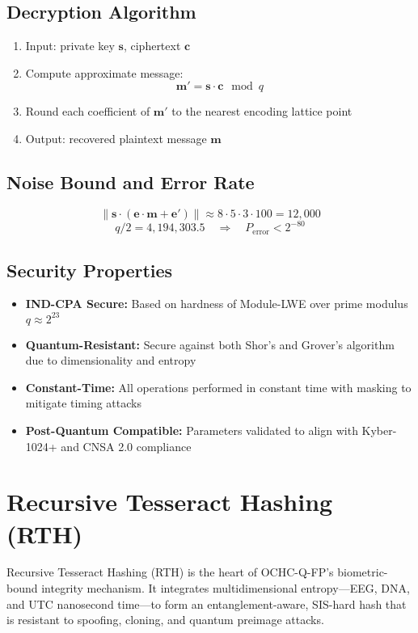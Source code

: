 \documentclass[12pt]{article}
\begin{document}
\subsection*{Decryption Algorithm}

\begin{enumerate}
    \item Input: private key \( \mathbf{s} \), ciphertext \( \mathbf{c} \)
    \item Compute approximate message:
    \[
    \mathbf{m'} = \mathbf{s} \cdot \mathbf{c} \mod q
    \]
    \item Round each coefficient of \( \mathbf{m'} \) to the nearest encoding lattice point
    \item Output: recovered plaintext message \( \mathbf{m} \)
\end{enumerate}

\subsection*{Noise Bound and Error Rate}

\[
\|\mathbf{s} \cdot (\mathbf{e} \cdot \mathbf{m} + \mathbf{e}')\| \approx 8 \cdot 5 \cdot 3 \cdot 100 = 12{,}000
\]
\[
q/2 = 4{,}194{,}303.5 \quad \Rightarrow \quad P_{\text{error}} < 2^{-80}
\]

\subsection*{Security Properties}

\begin{itemize}
    \item \textbf{IND-CPA Secure:} Based on hardness of Module-LWE over prime modulus \( q \approx 2^{23} \)
    \item \textbf{Quantum-Resistant:} Secure against both Shor’s and Grover’s algorithm due to dimensionality and entropy
    \item \textbf{Constant-Time:} All operations performed in constant time with masking to mitigate timing attacks
    \item \textbf{Post-Quantum Compatible:} Parameters validated to align with Kyber-1024+ and CNSA 2.0 compliance
\end{itemize}
\section*{Recursive Tesseract Hashing (RTH)}

Recursive Tesseract Hashing (RTH) is the heart of OCHC-Q-FP's biometric-bound integrity mechanism. It integrates multidimensional entropy—EEG, DNA, and UTC nanosecond time—to form an entanglement-aware, SIS-hard hash that is resistant to spoofing, cloning, and quantum preimage attacks.
\end{document}
